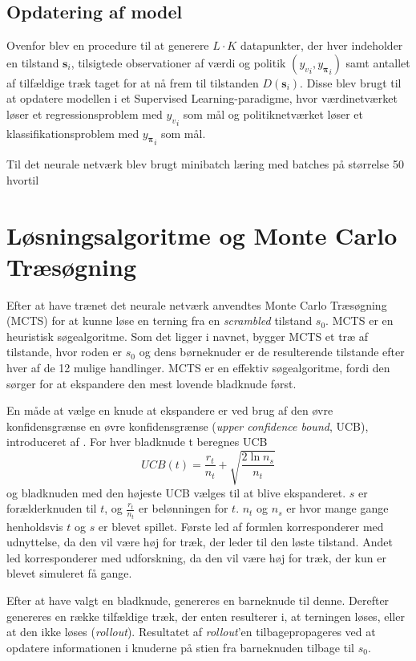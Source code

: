 \documentclass[../main.tex]{subfiles}
\begin{document}
\subsection*{Opdatering af model}

Ovenfor blev en procedure til at generere \(L\cdot K\) datapunkter, der hver indeholder en tilstand \(\mathbf s_i\), tilsigtede observationer af værdi og politik \(\left({y_{v}}_i, {y_{\bm \pi }}_i \right)\) samt antallet af tilfældige træk taget for at nå frem til tilstanden \(D(\mathbf s_i)\). Disse blev  brugt til at opdatere modellen i et Supervised Learning-paradigme, hvor værdinetværket løser et regressionsproblem med \({y_{v}}_i\) som mål og politiknetværket løser et klassifikationsproblem med \({y_{\bm \pi }}_i\) som mål. 

Til det neurale netværk blev brugt minibatch læring med batches på størrelse 50 hvortil 





\section{Løsningsalgoritme og Monte Carlo Træsøgning}
Efter at have trænet det neurale netværk anvendtes Monte Carlo Træsøgning (MCTS) for at kunne løse en terning fra en \emph{scrambled} tilstand $s_0$. MCTS er en heuristisk søgealgoritme. Som det ligger i navnet, bygger MCTS et træ af tilstande, hvor roden er $s_0$ og dens børneknuder er de resulterende tilstande efter hver af de 12 mulige handlinger. MCTS er en effektiv søgealgoritme, fordi den sørger for at ekspandere den mest lovende bladknude først. 

En måde at vælge en knude at ekspandere er ved brug af den øvre konfidensgrænse en øvre konfidensgrænse (\emph{upper confidence bound}, UCB), introduceret af \cite{Kocsis06banditbased}. For hver bladknude t beregnes UCB
$$UCB(t)=\frac{r_t}{n_t}+\sqrt{\frac{2\ln n_s}{n_t}}$$
og bladknuden med den højeste UCB vælges til at blive ekspanderet. $s$ er forælderknuden til $t$, og $\frac{r_t}{n_t}$ er belønningen for $t$. $n_t$ og $n_s$ er hvor mange gange henholdsvis $t$ og $s$ er blevet spillet. Første led af formlen korresponderer med udnyttelse, da den vil være høj for træk, der leder til den løste tilstand. Andet led korresponderer med udforskning, da den vil være høj for træk, der kun er blevet simuleret få gange. 

Efter at have valgt en bladknude, genereres en barneknude til denne. Derefter genereres en række tilfældige træk, der enten resulterer i, at terningen løses, eller at den ikke løses (\emph{rollout}). Resultatet af \emph{rollout}'en tilbagepropageres ved at opdatere informationen i knuderne på stien fra barneknuden tilbage til $s_0$. 
\end{document}
